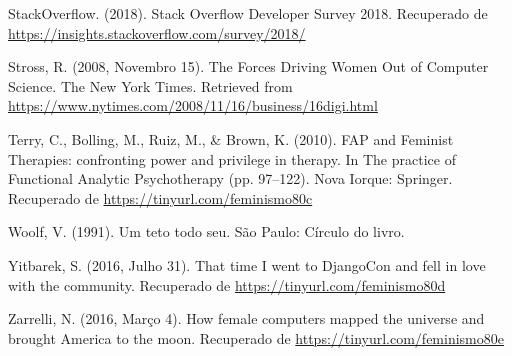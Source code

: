 \hangindent=25pt
\noindent StackOverflow. (2018). Stack Overflow Developer Survey 2018. Recuperado de \url{https://insights.stackoverflow.com/survey/2018/}

\hangindent=25pt
\noindent Stross, R. (2008, Novembro 15). The Forces Driving Women Out of Computer Science. The New York Times. Retrieved from \url{https://www.nytimes.com/2008/11/16/business/16digi.html}

\hangindent=25pt
\noindent Terry, C., Bolling, M., Ruiz, M., \& Brown, K. (2010). FAP and Feminist Therapies: confronting power and privilege in therapy. In The practice of Functional Analytic Psychotherapy (pp. 97–122). Nova Iorque: Springer. Recuperado de \url{https://tinyurl.com/feminismo80c}

\hangindent=25pt
\noindent Woolf, V. (1991). Um teto todo seu. São Paulo: Círculo do livro.

\hangindent=25pt
\noindent Yitbarek, S. (2016, Julho 31). That time I went to DjangoCon and fell in love with the community. Recuperado de \url{https://tinyurl.com/feminismo80d}

\hangindent=25pt
\noindent Zarrelli, N. (2016, Março 4). How female computers mapped the universe and brought America to the moon. Recuperado de \url{https://tinyurl.com/feminismo80e}


